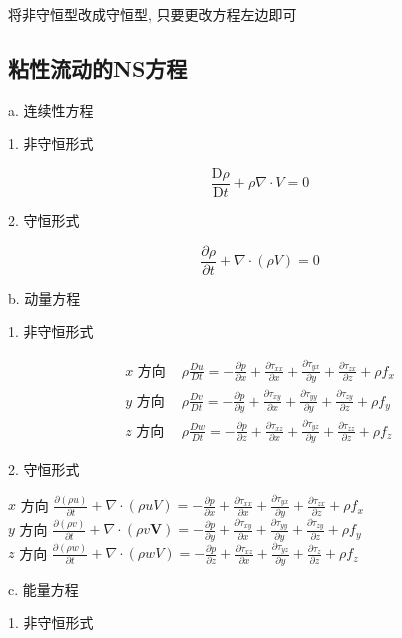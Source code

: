\documentclass[UTF8]{ctexart}
\begin{document}
将非守恒型改成守恒型, 只要更改方程左边即可

\subsection{粘性流动的NS方程}
a. 连续性方程

1. 非守恒形式

$$
	\frac{\mathrm{D} \rho}{\mathrm{D} t}+\rho \nabla \cdot V=0
$$

2. 守恒形式


$$
	\frac{\partial \rho}{\partial t}+\nabla \cdot(\rho V)=0
$$

b. 动量方程

1. 非守恒形式

$$
	\begin{array}{ll}
		x \text { 方向 } & \rho \frac{D u}{D t}=-\frac{\partial p}{\partial x}+\frac{\partial \tau_{x x}}{\partial x}+\frac{\partial \tau_{y x}}{\partial y}+\frac{\partial \tau_{z x}}{\partial z}+\rho f_{x} \\
		y \text { 方向 } & \rho \frac{D v}{D t}=-\frac{\partial p}{\partial y}+\frac{\partial \tau_{x y}}{\partial x}+\frac{\partial \tau_{y y}}{\partial y}+\frac{\partial \tau_{z y}}{\partial z}+\rho f_{y} \\
		z \text { 方向 } & \rho \frac{D w}{D t}=-\frac{\partial p}{\partial z}+\frac{\partial \tau_{x z}}{\partial x}+\frac{\partial \tau_{y z}}{\partial y}+\frac{\partial \tau_{z z}}{\partial z}+\rho f_{z}
	\end{array}
$$

2. 守恒形式

$x$ 方向 $\frac{\partial(\rho u)}{\partial t}+\nabla \cdot(\rho u V)=-\frac{\partial p}{\partial x}+\frac{\partial \tau_{x x}}{\partial x}+\frac{\partial \tau_{y x}}{\partial y}+\frac{\partial \tau_{z x}}{\partial z}+\rho f_{x}$  \\
$y$ 方向 $\frac{\partial(\rho v)}{\partial t}+\nabla \cdot(\rho v \boldsymbol{V})=-\frac{\partial p}{\partial y}+\frac{\partial \tau_{x y}}{\partial x}+\frac{\partial \tau_{y y}}{\partial y}+\frac{\partial \tau_{z y}}{\partial z}+\rho f_{y}$ \\
$z$ 方向 $\frac{\partial(\rho w)}{\partial t}+\nabla \cdot(\rho w V)=-\frac{\partial p}{\partial z}+\frac{\partial \tau_{x z}}{\partial x}+\frac{\partial \tau_{y z}}{\partial y}+\frac{\partial \tau_{z}}{\partial z}+\rho f_{z}$

c. 能量方程

1. 非守恒形式
\end{document}
